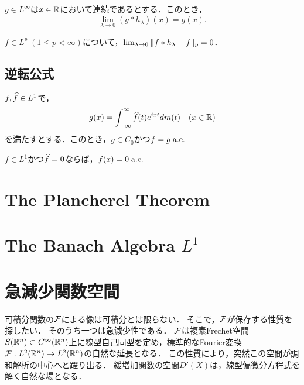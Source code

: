 \documentclass[uplatex,dvipdfmx]{jsreport}
\begin{document}
\begin{proposition}
    $g\in L^\infty$は$x\in\mathbb{R}$において連続であるとする．このとき，
    \[\lim_{\lambda\to 0}(g*h_\lambda)(x)=g(x).\]
\end{proposition}

\begin{proposition}
    $f\in L^p\;(1\le p<\infty)$について，$\lim_{\lambda\to0}\|f*h_\lambda-f\|_p=0$．
\end{proposition}

\subsection{逆転公式}

\begin{theorem}
    $f,\widehat{f}\in L^1$で，
    \[g(x)=\int^\infty_{-\infty}\widehat{f}(t)e^{ixt}dm(t)\quad(x\in\mathbb{R})\]
    を満たすとする．このとき，$g\in C_0$かつ$f=g\;\mathrm{a.e.}\;$
\end{theorem}

\begin{theorem}
    $f\in L^1$かつ$\widehat{f}=0$ならば，$f(x)=0\;\mathrm{a.e.}\;$
\end{theorem}

\section{The Plancherel Theorem}

\section{The Banach Algebra $L^1$}

\section{急減少関数空間}

\begin{tcolorbox}[colframe=ForestGreen, colback=ForestGreen!10!white,breakable,colbacktitle=ForestGreen!40!white,coltitle=black,fonttitle=\bfseries\sffamily,
title=]
    可積分関数の$\mathcal{F}$による像は可積分とは限らない．
    そこで，$\mathcal{F}$が保存する性質を探したい．
    そのうち一つは急減少性である．
    $\mathcal{F}$は複素Frechet空間$S(\mathbb{R}^n)\subset C^\infty(\mathbb{R}^n)$上に線型自己同型を定め，標準的なFourier変換$\mathcal{F}:L^2(\mathbb{R}^n)\to L^2(\mathbb{R}^n)$の自然な延長となる．
    この性質により，突然この空間が調和解析の中心へと躍り出る．
    緩増加関数の空間$D'(X)$は，線型偏微分方程式を解く自然な場となる．
\end{tcolorbox}
\end{document}
